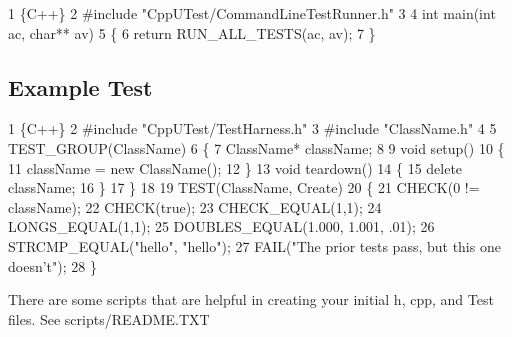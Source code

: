\begin{DoxyCode}
1 \{C++\}
2 #include "CppUTest/CommandLineTestRunner.h"
3 
4 int main(int ac, char** av)
5 \{
6   return RUN\_ALL\_TESTS(ac, av);
7 \}
\end{DoxyCode}


\subsection*{Example Test}


\begin{DoxyCode}
1 \{C++\}
2 #include "CppUTest/TestHarness.h"
3 #include "ClassName.h"
4 
5 TEST\_GROUP(ClassName)
6 \{
7   ClassName* className;
8 
9   void setup()
10   \{
11     className = new ClassName();
12   \}
13   void teardown()
14   \{
15     delete className;
16   \}
17 \}
18 
19 TEST(ClassName, Create)
20 \{
21   CHECK(0 != className);
22   CHECK(true);
23   CHECK\_EQUAL(1,1);
24   LONGS\_EQUAL(1,1);
25   DOUBLES\_EQUAL(1.000, 1.001, .01);
26   STRCMP\_EQUAL("hello", "hello");
27   FAIL("The prior tests pass, but this one doesn't");
28 \}
\end{DoxyCode}


There are some scripts that are helpful in creating your initial h, cpp, and Test files. See scripts/\+R\+E\+A\+D\+M\+E.\+T\+XT 